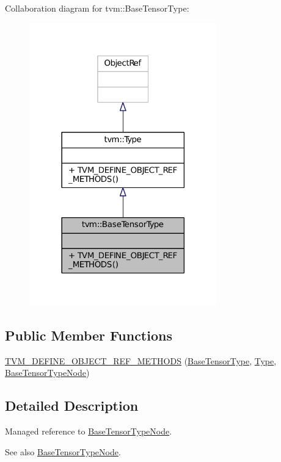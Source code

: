 Collaboration diagram for tvm\+:\+:Base\+Tensor\+Type\+:
\nopagebreak
\begin{figure}[H]
\begin{center}
\leavevmode
\includegraphics[width=230pt]{classtvm_1_1BaseTensorType__coll__graph}
\end{center}
\end{figure}
\subsection*{Public Member Functions}
\begin{DoxyCompactItemize}
\item 
\hyperlink{classtvm_1_1BaseTensorType_a4bb22cee852ae3a6b73d28dde0e7e64e}{T\+V\+M\+\_\+\+D\+E\+F\+I\+N\+E\+\_\+\+O\+B\+J\+E\+C\+T\+\_\+\+R\+E\+F\+\_\+\+M\+E\+T\+H\+O\+DS} (\hyperlink{classtvm_1_1BaseTensorType}{Base\+Tensor\+Type}, \hyperlink{classtvm_1_1Type}{Type}, \hyperlink{classtvm_1_1BaseTensorTypeNode}{Base\+Tensor\+Type\+Node})
\end{DoxyCompactItemize}


\subsection{Detailed Description}
Managed reference to \hyperlink{classtvm_1_1BaseTensorTypeNode}{Base\+Tensor\+Type\+Node}. 

\begin{DoxySeeAlso}{See also}
\hyperlink{classtvm_1_1BaseTensorTypeNode}{Base\+Tensor\+Type\+Node}. 
\end{DoxySeeAlso}


